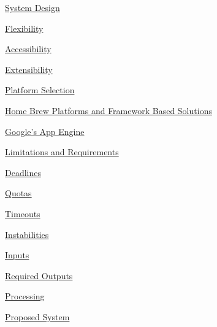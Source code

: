 \documentclass[10pt,a4paper,english]{article}
\begin{document}
\begin{list}{}{}
\item {} \href{\#system-design}{System Design}
\begin{list}{}{}
\item {} \href{\#flexibility}{Flexibility}
\begin{list}{}{}
\item {} \href{\#accessibility}{Accessibility}

\item {} \href{\#extensibility}{Extensibility}

\end{list}

\item {} \href{\#platform-selection}{Platform Selection}
\begin{list}{}{}
\item {} \href{\#home-brew-platforms-and-framework-based-solutions}{Home Brew Platforms and Framework Based Solutions}

\item {} \href{\#google-s-app-engine}{Google's App Engine}
\begin{list}{}{}
\item {} \href{\#limitations-and-requirements}{Limitations and Requirements}
\begin{list}{}{}
\item {} \href{\#deadlines}{Deadlines}

\item {} \href{\#quotas}{Quotas}

\item {} \href{\#timeouts}{Timeouts}

\item {} \href{\#instabilities}{Instabilities}

\end{list}

\end{list}

\end{list}

\item {} \href{\#inputs}{Inputs}

\item {} \href{\#required-outputs}{Required Outputs}

\item {} \href{\#processing}{Processing}

\item {} \href{\#proposed-system}{Proposed System}

\end{list}


\end{list}
\end{document}
